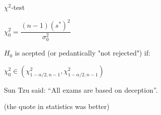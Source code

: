 \documentclass[11pt]{article}
\begin{document}
\(\chi^2\)-test


\(\chi^2_0 = \dfrac{(n-1) (s^*)^2}{\sigma_0^2} \)
\medskip

\(H_0\) is acepted (or pedantically  "not rejected") if:

\( \chi^2_0 \in (\chi^2_{1-\alpha/2, n-1}, \chi^2_{1-\alpha/2, n-1}) \)

\bigskip


Sun Tzu said: “All exams are based on deception”.

(the quote in statistics was better)
\end{document}
